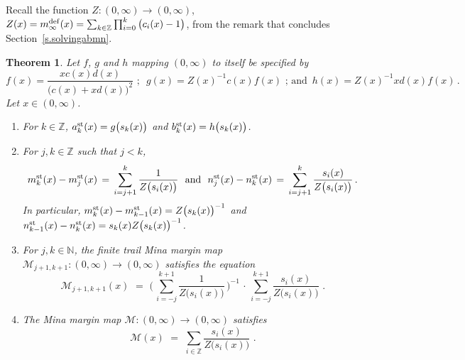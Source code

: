 \documentclass[letterpaper,11pt,oneside,reqno]{amsbook}
\newcommand{\N}{\ensuremath{\mathbb{N}}}
\newcommand{\Z}{\ensuremath{\mathbb{Z}}}
\newtheorem{theorem}{Theorem}[chapter]
\numberwithin{figure}{chapter}
\theoremstyle{definition}
\theoremstyle{definition}
\theoremstyle{definition}
\theoremstyle{definition}
\theoremstyle{definition}
\newcommand{\nwithzero}{\N}
\newcommand{\mdef}{m^{\rm def}}
\newcommand{\asta}{a^{\rm st}}
\newcommand{\bst}{b^{\rm st}}
\newcommand{\mst}{m^{\rm st}}
\newcommand{\nst}{n^{\rm st}}
\newcommand{\minamm}{\mathcal{M}}
\begin{document}
Recall the function $Z:(0,\infty) \to (0,\infty)$, $Z(x) = \mdef_\infty(x) =  \sum_{k \in \Z} \prod_{i=0}^k \big( c_i(x) - 1 \big)$, from the remark that concludes Section~\ref{s.solvingabmn}.
\begin{theorem}\label{t.altstand}
Let $f$, $g$ and $h$ mapping $(0,\infty)$ to itself be specified by 
$$
 f(x) = \frac{x c(x)d(x)}{\big( c(x) + x d(x) \big)^2} \, \,  ; \, \, \, g(x) = Z(x)^{-1}c(x) f(x) \, \,  ; \, \textrm{and} \, \, \, h(x) =  Z(x)^{-1} x d(x) f(x) \, .
$$ 
Let $x \in (0,\infty)$.
\begin{enumerate}
\item For $k \in \Z$, $\asta_k(x) = g \big( s_k(x) \big)$ and $\bst_k(x) = h \big( s_k(x) \big)$.
\item
For $j,k \in \Z$ such that $j < k$,
$$
 \mst_k(x) - \mst_j(x) \, = \, \sum_{i = j+1}^k \frac{1}{Z \big( s_i(x)  \big)} \, \, \, \, \textrm{and} \, \, \, \, 
 \nst_j(x) - \nst_k(x) \, = \, \sum_{i = j+1}^k \frac{s_i(x)}{Z \big( s_i(x)  \big)} \, .
$$
In particular,
$\mst_k(x) - \mst_{k-1}(x) =Z \big( s_k(x)  \big)^{-1}$ and $\nst_{k-1}(x) - \nst_k(x) = s_k(x) Z \big( s_k(x) \big)^{-1}$.
\item For $j,k \in \nwithzero$, 
the finite trail Mina margin map  $\minamm_{j+1,k+1}:(0,\infty) \to (0,\infty)$ satisfies the equation
$$
 \minamm_{j+1,k+1}(x) \, \, = \, \,   \Bigg( \, \sum_{i = -j}^{k+1} \frac{1}{Z \big( s_i(x)  \big)} \, \Bigg)^{-1} \, \cdot \, \sum_{i = -j}^{k+1} \frac{s_i(x)}{Z \big( s_i(x)  \big)} \, \, .
$$
\item The Mina margin map  $\minamm:(0,\infty) \to (0,\infty)$ satisfies
$$
 \minamm(x) \, \, = \, \,   %
 \sum_{i \in \Z} \frac{s_i(x)}{Z \big( s_i(x)  \big)} \, \, .
$$
\end{enumerate}
\end{theorem}
\end{document}
